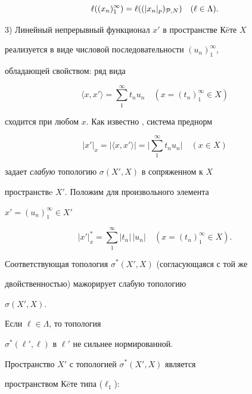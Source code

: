 $$


\ell ((x_n)_1^\infty)=\ell((|x_n|_p)_{{\cal P},N})\quad


(\ell\in\Lambda).


$$





3) Линейный непрерывный функционал $x'$  в пространстве К\"eте $X$


реализуется в виде числовой последовательности $(u_n)_1^\infty$,


обладающей свойством: ряд вида


$$


\langle x,x'\rangle=\sum_1^\infty t_nu_n \quad (x=(t_n)_1^\infty\in X)


$$


сходится при любом $x$. Как известно \cite{2RR}, система преднорм


$$


|x'|_x =|\langle x,x'\rangle|=\Big|\sum_1^\infty t_nu_n\Big| \quad (x\in X)


$$


задает {\it слабую} топологию $\sigma(X',X)$ в сопряженном к $X$


пространствe $X'$. Положим для произвольного элемента


$x'=(u_n)_1^\infty\in X'$


$$


|x'|_x^*=\sum_1^\infty |t_n|\,|u_n| \quad (x=(t_n)_1^\infty\in X).


$$


Соответствующая топология $\sigma^*(X',X)$ (согласующаяся с той же


двойственностью) мажорирует слабую топологию


$\sigma(X',X)$.





\begin{note}


Если $\ell\in \Lambda$, то топология


$\sigma^*(\ell',\ell)$ в $\ell'$ не сильнее нормированной.


\end{note}





Пространство $X'$ с топологией $\sigma^*(X',X)$ является


пространством К\"eте типа ($\ell_1$):


$$


